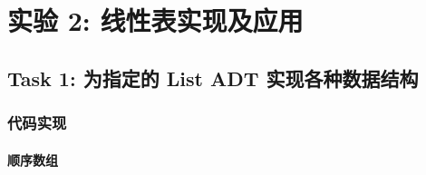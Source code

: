 \chapter{实验 2: 线性表实现及应用}
\section{Task 1: 为指定的 List ADT 实现各种数据结构}

\subsection{代码实现}

\subsubsection{顺序数组}

